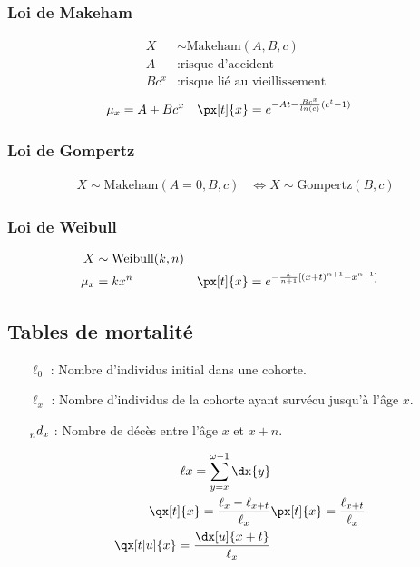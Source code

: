 \documentclass[10pt, french]{article}
\begin{document}
\begin{multicols*}{3}
\subsubsection*{Loi de Makeham}
\begin{align*}
	X &\sim \text{Makeham}(A, B, c) \\
	A &: \text{risque d'accident} \\
	Bc^x &: \text{risque  lié au vieillissement} 
\end{align*}
\begin{align*}
	\mu_x &= A + B c^x &
	\px[t]{x} &= e^{-At - \frac{B c^x}{ln(c)}(c^t - 1)}
\end{align*}
	
\subsubsection*{Loi de Gompertz}
\begin{align*}
	X \sim \text{Makeham}(A = 0, B, c) &\Leftrightarrow X \sim \text{Gompertz}(B, c) 
\end{align*}

\subsubsection*{Loi de Weibull}
\begin{align*}
	X &\sim \text{Weibull}(k, n) \\
	\mu_x &= k x^n	&
	\px[t]{x} &= e^{-\frac{k}{n + 1}[(x + t)^{n + 1} - x^{n + 1}]}
\end{align*}


\subsection{Tables de mortalité}
\begin{itemize}
\item[$\ell_0$ : ] Nombre d'individus initial dans une cohorte.
\item[$\ell_x$ : ] Nombre d'individus de la cohorte ayant survécu jusqu'à l'âge $x$.
\item[$\prescript{}{n}d_{x}$ : ] Nombre de décès entre l'âge $x$ et $x+n$.

\begin{align*}
\ell{x} = \sum_{y = x}^{\omega - 1} \dx{y} \\
\qx[t]{x} = \frac{\ell_x - \ell_{x+t}}{\ell_x} &
\px[t]{x} = \frac{\ell_{x+t}}{\ell_x} \\
\qx[t|u]{x} = \frac{\dx[u]{x+t}}{\ell_x}
\end{align*}



\end{itemize}
\end{multicols*}
\end{document}
